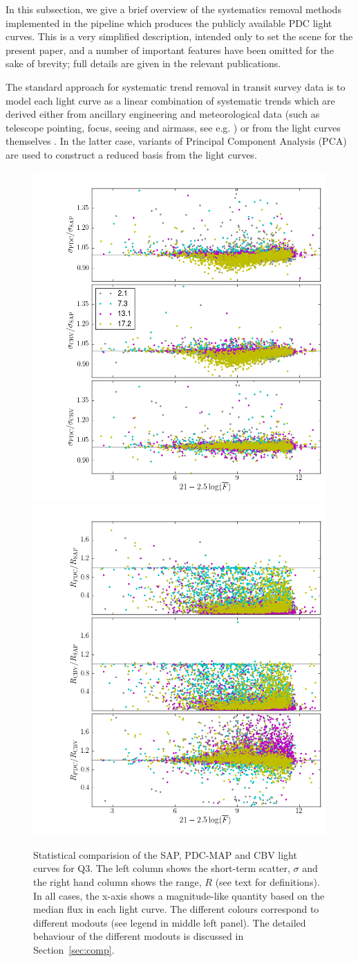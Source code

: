 \documentclass[useAMS,usenatbib]{mn2e}
\begin{document}
In this subsection, we give a brief overview of the systematics
removal methods implemented in the pipeline which produces the
publicly available PDC light curves. This is a very simplified
description, intended only to set the scene for the present paper, and
a number of important features have been omitted for the sake of
brevity; full details are given in the relevant publications.

The standard approach for systematic trend removal in transit survey
data is to model each light curve as a linear combination of
systematic trends which are derived either from ancillary engineering
and meteorological data (such as telescope pointing, focus, seeing and
airmass, see e.g. \citealt{bak+07}) or from the light curves
themselves \citep{tam+05,kov+05}. In the latter case, variants of
Principal Component Analysis (PCA) are used to construct a reduced
basis from the light curves.

\begin{figure}
  \centering
  \includegraphics[width=0.49\linewidth]{fig2a.png} \hfill
  \includegraphics[width=0.49\linewidth]{fig2b.png}
  \caption{Statistical comparision of the SAP, PDC-MAP and CBV light
    curves for Q3. The left column shows the short-term scatter, $\sigma$ and
    the right hand column shows the range, $R$ (see text for
    definitions). In all cases, the x-axis shows a magnitude-like
    quantity based on the median flux in each light curve. The
    different colours correspond to different modouts (see legend in
    middle left panel). The detailed behaviour of the different modouts is discussed
  in Section~\ref{sec:comp}.}
  \label{fig:sig_ran_comp}
\end{figure}
\end{document}

